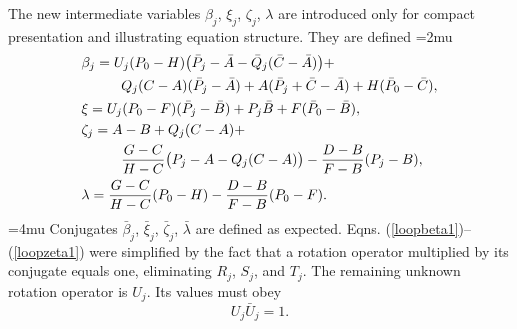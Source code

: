 \documentclass[journal]{IEEEtran}
\def\*#1{\bar{#1}} %
\begin{document}
The new intermediate variables $\beta_j$, $\xi_j$, $\zeta_j$, $\lambda$ are introduced only for compact presentation and illustrating equation structure.  They are defined
\medmuskip=2mu
\begin{align}
&\beta_j = U_j(P_0-H)\big(\*P_j-\*A-\*Q_j(\*C-\*A)\big) + \nonumber\\
&\hspace{10mm} Q_j(C-A)(\*P_j-\*A) + A(\*P_j+\*C-\*A) + H(\*P_0-\*C), \nonumber\\
&\xi = U_j(P_0-F)(\*P_j-\*B) + P_j\*B + F(\*P_0-\*B), \nonumber\\
&\zeta_j = A-B+Q_j(C-A) + \nonumber\\
&\hspace{10mm} \frac{G-C}{H-C}\big(P_j-A-Q_j(C-A)\big) - \frac{D-B}{F-B}(P_j-B), \nonumber\\
&\lambda = \frac{G-C}{H-C}(P_0-H)-\frac{D-B}{F-B}(P_0-F). \label{expansion1}
\end{align}
\medmuskip=4mu
Conjugates $\*\beta_j$, $\*\xi_j$, $\*\zeta_j$, $\*\lambda$ are defined as expected.  Eqns. (\ref{loopbeta1})--(\ref{loopzeta1}) were simplified by the fact that a rotation operator multiplied by its conjugate equals one, eliminating $R_j$, $S_j$, and $T_j$.  The remaining unknown rotation operator is $U_j$.  Its values must obey
\begin{equation}
U_j \*U_j = 1.
\label{Unorm}
\end{equation}
\end{document}
